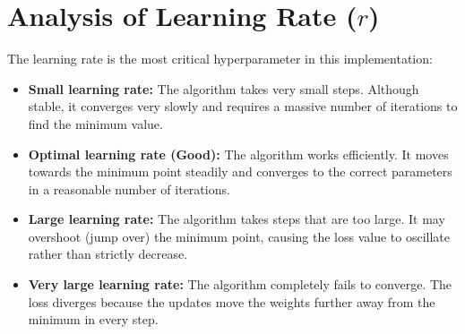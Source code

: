 \documentclass[12pt,a4paper]{article}
\begin{document}
\section{Analysis of Learning Rate ($r$)}
The learning rate is the most critical hyperparameter in this implementation:
\begin{itemize}
    \item \textbf{Small learning rate:} The algorithm takes very small steps. Although stable, it converges very slowly and requires a massive number of iterations to find the minimum value.
    \item \textbf{Optimal learning rate (Good):} The algorithm works efficiently. It moves towards the minimum point steadily and converges to the correct parameters in a reasonable number of iterations.
    \item \textbf{Large learning rate:} The algorithm takes steps that are too large. It may overshoot (jump over) the minimum point, causing the loss value to oscillate rather than strictly decrease.
    \item \textbf{Very large learning rate:} The algorithm completely fails to converge. The loss diverges because the updates move the weights further away from the minimum in every step.
\end{itemize}
\end{document}
